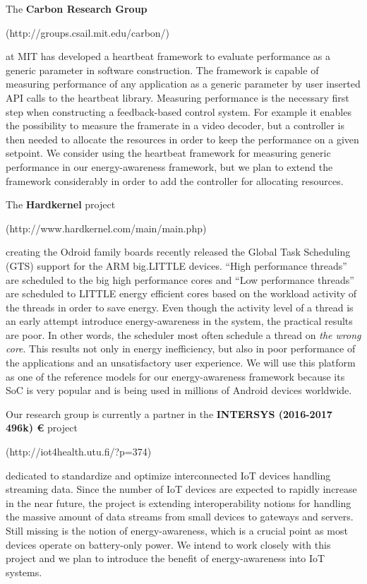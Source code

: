 \documentclass{article}
\begin{document}
The \textbf{Carbon Research Group}\begin{small}{ (http://groups.csail.mit.edu/carbon/)} \end{small} at MIT has developed a heartbeat framework to evaluate performance as a generic parameter in software construction.
The framework is capable of measuring performance of any application as a generic parameter by user inserted API calls to the heartbeat library. 
Measuring performance is the necessary first step when constructing a feedback-based control system. 
For example it enables the possibility to measure the framerate in a video decoder, but a controller is then needed to allocate the resources in order to keep the performance on a given setpoint. 
We consider using the heartbeat framework for measuring generic performance in our energy-awareness framework, 
but we plan to extend the framework considerably in order to add the controller for allocating resources.\smallskip

The \textbf{Hardkernel} project\begin{small}{ (http://www.hardkernel.com/main/main.php)} \end{small} creating the Odroid family boards recently released the Global Task Scheduling (GTS) support for the ARM big.LITTLE devices. ``High performance threads'' are scheduled to the big high performance cores and ``Low performance threads'' are scheduled to LITTLE energy efficient cores based on the workload activity of the threads in order to save energy. 
Even though the activity level of a thread is an early attempt introduce energy-awareness in the system, the practical results are poor. 
In other words, the scheduler most often schedule a thread on \textit{the wrong core}. 
This results not only in energy inefficiency, but also in poor performance of the applications and an unsatisfactory user experience.
We will use this platform as one of the reference models for our energy-awareness framework because its SoC is very popular and is being used in millions of Android devices worldwide.\smallskip

Our research group is currently a partner in the \textbf{INTERSYS (2016-2017 496k) \euro} project\\ \begin{small}{ (http://iot4health.utu.fi/?p=374)} \end{small} dedicated to standardize and optimize interconnected IoT devices handling streaming data. Since the number of IoT devices are expected to rapidly increase in the near future, the project is extending interoperability notions for handling the massive amount of data streams from small devices to gateways and servers. 
Still missing is the notion of energy-awareness, which is a crucial point as most devices operate on battery-only power. 
We intend to work closely with this project and we plan to introduce the benefit of energy-awareness into IoT systems.\smallskip
\end{document}
